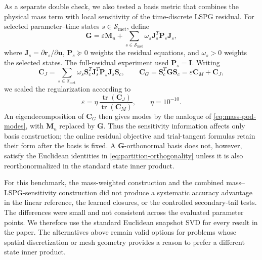 \documentclass[11pt]{article}
\newcommand{\uvec}{\mathbf u}
\begin{document}
As a separate double check, we also tested a basis metric that combines the
physical mass term with local sensitivity of the time-discrete LSPG residual.
For selected parameter--time states $s\in\mathcal S_{\mathrm{met}}$, define
\begin{equation}
\mathbf G
=\varepsilon\mathbf M_u+
\sum_{s\in\mathcal S_{\mathrm{met}}}
\omega_s\mathbf J_s^T\mathbf P_s\mathbf J_s,
\label{eq:combined-lspg-mass-metric}
\end{equation}
where $\mathbf J_s=\partial\mathbf r_s/\partial\uvec$,
$\mathbf P_s\succeq0$ weights the residual equations, and $\omega_s>0$
weights the selected states.  The full-residual experiment used
$\mathbf P_s=\mathbf I$.  Writing
\begin{equation}
\mathbf C_J=
\sum_{s\in\mathcal S_{\mathrm{met}}}
\omega_s\mathbf S_c^T\mathbf J_s^T\mathbf P_s\mathbf J_s\mathbf S_c,
\qquad
\mathbf C_G=\mathbf S_c^T\mathbf G\mathbf S_c
=\varepsilon\mathbf C_M+\mathbf C_J,
\label{eq:combined-lspg-correlation}
\end{equation}
we scaled the regularization according to
\begin{equation}
\varepsilon=\eta\,
\frac{\operatorname{tr}(\mathbf C_J)}
{\operatorname{tr}(\mathbf C_M)},
\qquad \eta=10^{-10}.
\label{eq:combined-lspg-mass-scale}
\end{equation}
An eigendecomposition of $\mathbf C_G$ then gives modes by the analogue of
\eqref{eq:mass-pod-modes}, with $\mathbf M_u$ replaced by $\mathbf G$.
Thus the sensitivity information affects only basis construction; the online
residual objective and trial-tangent formulas retain their form after the
basis is fixed.  A $\mathbf G$-orthonormal basis does not, however, satisfy
the Euclidean identities in \eqref{eq:partition-orthogonality} unless it is
also reorthonormalized in the standard state inner product.

For this benchmark, the mass-weighted construction and the combined
mass--LSPG-sensitivity construction did not produce a systematic accuracy
advantage in the linear reference, the learned closures, or the controlled
secondary-tail tests.  The differences were small and not consistent across
the evaluated parameter points.  We therefore use the standard Euclidean
snapshot SVD for every result in the paper.  The alternatives above remain
valid options for problems whose spatial discretization or mesh geometry
provides a reason to prefer a different state inner product.


\end{document}
